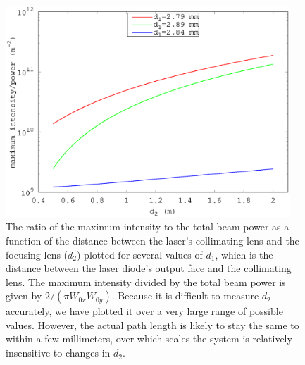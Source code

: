\begin{figure}
    \centerline{\includegraphics[width=0.95\textwidth]{waists1.eps}}
    \caption[Maximum intensity$/$total beam power vs distance]{\label{waists111} The ratio of the maximum intensity to the total beam power as a function of the distance between the laser's collimating lens and the focusing lens ($d_2$) plotted for several values of $d_1$, which is the distance between the laser diode's output face and the collimating lens. The maximum intensity divided by the total beam power is given by $2/(\pi W_{0x}W_{0y})$. Because it is difficult to measure $d_2$ accurately, we have plotted it over a very large range of possible values. However, the actual path length is likely to stay the same to within a few millimeters, over which scales the system is relatively insensitive to changes in $d_2$.} 
\end{figure}

